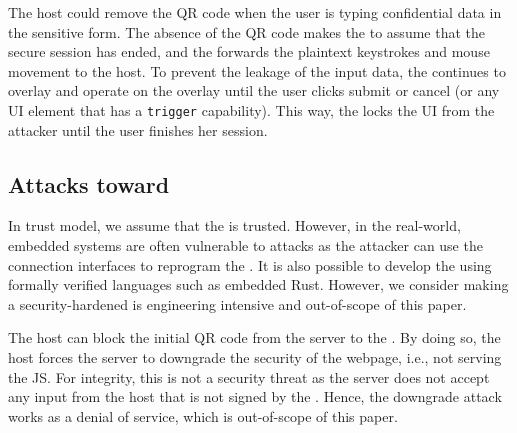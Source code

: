 \parasave
{} The host could remove the QR code when the user is typing confidential data in the sensitive form. The absence of the QR code makes the \device to assume that the secure session has ended, and the \device forwards the plaintext keystrokes and mouse movement to the host. To prevent the leakage of the input data, the \device continues to overlay and operate on the overlay until the user clicks submit or cancel (or any UI element that has a \texttt{trigger}  capability). This way, the \device locks the UI from the attacker until the user finishes her session.

\subsection{Attacks toward \device} 
\label{sec:securityAnalysis:device}

In \name trust model, we assume that the \device is trusted. However, in the real-world, embedded systems are often vulnerable to attacks as the attacker can use the connection interfaces to reprogram the \device. It is also possible to develop the \device using formally verified languages such as embedded Rust. However, we consider making a security-hardened \device is engineering intensive and out-of-scope of this paper. 

\parasave
{} The host can block the initial QR code from the server to the \device. By doing so, the host forces the server to downgrade the security of the webpage, i.e., not serving the \name JS. For integrity, this is not a security threat as the server does not accept any input from the host that is not signed by the \device. Hence, the downgrade attack works as a denial of service, which is out-of-scope of this paper.


